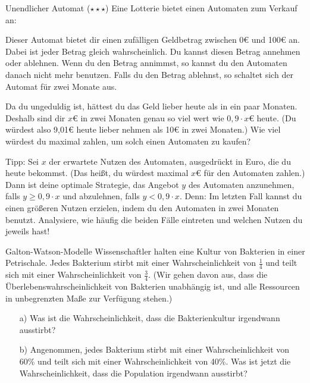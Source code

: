 \documentclass{uebungszettel}
\begin{document}
\begin{aufgabe}{Unendlicher Automat ($\star \star \star$)}
  Eine Lotterie bietet einen Automaten zum Verkauf an:
  \begin{addmargin}{1cm}
    Dieser Automat bietet dir einen zufälligen Geldbetrag zwischen 0\euro{} und 100\euro{} an.
    Dabei ist jeder Betrag gleich wahrscheinlich.
    Du kannst diesen Betrag annehmen oder ablehnen.
    Wenn du den Betrag annimmst, so kannst du den Automaten danach nicht mehr benutzen.
    Falls du den Betrag ablehnst, so schaltet sich der Automat für zwei Monate aus.
  \end{addmargin}
  Da du ungeduldig ist, hättest du das Geld lieber heute als in ein paar Monaten.
  Deshalb sind dir $x$\euro{} in zwei Monaten genau so viel wert wie $0,9 \cdot x$\euro{} heute.
  (Du würdest also 9,01\euro{} heute lieber nehmen als 10\euro{} in zwei Monaten.)
  Wie viel würdest du maximal zahlen, um solch einen Automaten zu kaufen?

  {\footnotesize Tipp:
    Sei $x$ der erwartete Nutzen des Automaten, ausgedrückt in Euro, die du heute bekommst.
    (Das heißt, du würdest maximal $x$\euro{} für den Automaten zahlen.)
    Dann ist deine optimale Strategie, das Angebot $y$ des Automaten anzunehmen, falls $y \geq 0,9 \cdot x$ und abzulehnen, falls $y < 0,9 \cdot x$.
    Denn: Im letzten Fall kannst du einen größeren Nutzen erzielen, indem du den Automaten in zwei Monaten benutzt.
    Analysiere, wie häufig die beiden Fälle eintreten und welchen Nutzen du jeweils hast!
   }
\end{aufgabe}

\newpage

\begin{aufgabe}{Galton-Watson-Modelle}
  Wissenschaftler halten eine Kultur von Bakterien in einer Petrischale.
  Jedes Bakterium stirbt mit einer Wahrscheinlichkeit von $\tfrac{1}{4}$ und teilt sich mit einer Wahrscheinlichkeit von $\tfrac{3}{4}$.
  (Wir gehen davon aus, dass die Überlebenswahrscheinlichkeit von Bakterien unabhängig ist, und alle Ressourcen in unbegrenzten Maße zur Verfügung stehen.)
  \begin{itemize}
    \item[a)] Was ist die Wahrscheinlichkeit, dass die Bakterienkultur irgendwann ausstirbt?
    \item[b)]
      Angenommen, jedes Bakterium stirbt mit einer Wahrscheinlichkeit von 60\% und teilt sich mit einer Wahrscheinlichkeit von 40\%.
      Was ist jetzt die Wahrscheinlichkeit, dass die Population irgendwann ausstirbt?
  \end{itemize}
\end{aufgabe}
\end{document}
